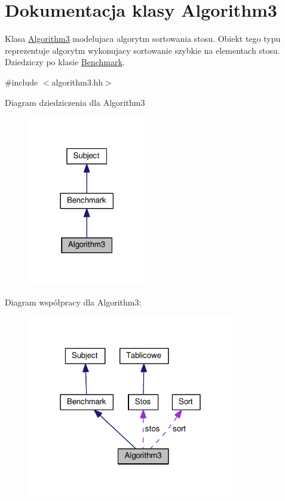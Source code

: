 \hypertarget{class_algorithm3}{\section{Dokumentacja klasy Algorithm3}
\label{class_algorithm3}
}


Klasa \hyperlink{class_algorithm3}{Algorithm3} modelujaca algorytm sortowania stosu. Obiekt tego typu reprezentuje algorytm wykonujacy sortowanie szybkie na elementach stosu. Dziedziczy po klasie \hyperlink{class_benchmark}{Benchmark}.  




{\ttfamily \#include $<$algorithm3.\-hh$>$}



Diagram dziedziczenia dla Algorithm3\nopagebreak
\begin{figure}[H]
\begin{center}
\leavevmode
\includegraphics[width=146pt]{class_algorithm3__inherit__graph}
\end{center}
\end{figure}


Diagram współpracy dla Algorithm3\-:\nopagebreak
\begin{figure}[H]
\begin{center}
\leavevmode
\includegraphics[width=255pt]{class_algorithm3__coll__graph}
\end{center}
\end{figure}
